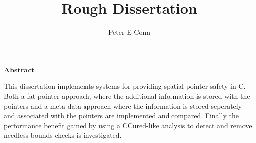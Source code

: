 \documentclass{book}
\title{Rough Dissertation}
\author{Peter E Conn}
\begin{document}
\maketitle

\textbf{Abstract}

This dissertation implememts systems for providing spatial pointer safety in C.
Both a fat pointer approach, where the additional information is stored with the pointers and a meta-data approach where the information is stored seperately and associated with the pointers are implemented and compared.
Finally the performance benefit gained by using a CCured-like analysis to detect and remove needless bounds checks is investigated.

\tableofcontents




\end{document}
